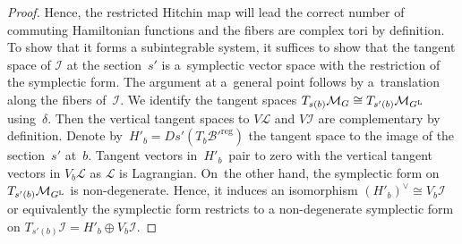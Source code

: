 \documentclass[10pt,a4paper]{amsart}
\numberwithin{equation}{section}
\theoremstyle{definition}
\newcommand{\reg}{\mathrm{reg}}
\newcommand{\calB}{\mathcal{B}}
\newcommand{\calI}{\mathcal{I}}
\newcommand{\calL}{\mathcal{L}}
\newcommand{\calM}{\mathcal{M}}
\begin{document}
\begin{proof}
 Hence, the restricted Hitchin map will lead the correct number of commuting Hamiltonian functions and the fibers are complex tori by definition. To show that it forms a subintegrable system, it suffices to show that the tangent space of $\calI$ at the section~$s'$ is a~symplectic vector space with the restriction of the symplectic form. The argument at a~general point follows by a~translation along the fibers of~$\calI$. We identify the tangent spaces $T_{s(b)}\calM_G \cong T_{s'(b)}\calM_{G^{\rm L}}$ using~$\delta$. Then the vertical tangent spaces to $V\calL$ and $V\calI$ are complementary by definition. Denote by~$H'_b=Ds'(T_b\calB'^\reg)$ the tangent space to the image of the section~$s'$ at~$b$. Tangent vectors in~$H'_b$~pair to zero with the vertical tangent vectors in $V_b\calL$ as $\calL$ is Lagrangian. On~the other hand, the symplectic form on $T_{s'(b)}\calM_{G^{\rm L}}$ is non-degenerate. Hence, it induces an isomorphism $(H'_b)^\vee \cong V_b\calI$ or equivalently the symplectic form restricts to a non-degenerate symplectic form on $T_{s'(b)} \calI=H'_b \oplus V_b \calI$.
\end{proof}
\end{document}

